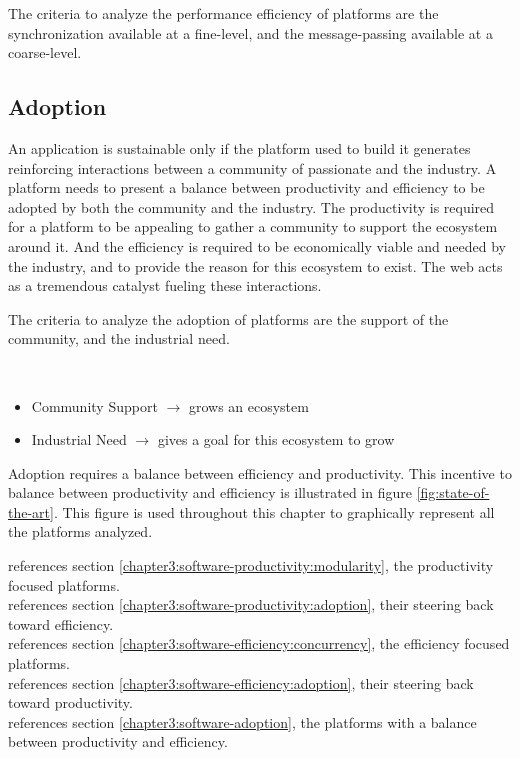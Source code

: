\separator

The criteria to analyze the performance efficiency of platforms are the synchronization available at a fine-level, and the message-passing available at a coarse-level.


\subsection{Adoption} \label{chapter3:definitions:adoption}

An application is sustainable only if the platform used to build it generates reinforcing interactions between a community of passionate and the industry.
A platform needs to present a balance between productivity and efficiency to be adopted by both the community and the industry.
The productivity is required for a platform to be appealing to gather a community to support the ecosystem around it.
And the efficiency is required to be economically viable and needed by the industry, and to provide the reason for this ecosystem to exist.
The web acts as a tremendous catalyst fueling these interactions.

\separator

The criteria to analyze the adoption of platforms are the support of the community, and the industrial need.

\atomic {
  \begin{itemize}
  \item Community Support
    \subitem $\to$ grows an ecosystem
  \item Industrial Need
    \subitem $\to$ gives a goal for this ecosystem to grow
  \end{itemize}
}

\separator

Adoption requires a balance between efficiency and productivity.
This incentive to balance between productivity and efficiency is illustrated in figure \ref{fig:state-of-the-art}.
This figure is used throughout this chapter to graphically represent all the platforms analyzed.

\noindent
{} references section \ref{chapter3:software-productivity:modularity}, the productivity focused platforms.\\
 references section \ref{chapter3:software-productivity:adoption}, their steering back toward efficiency.\\
 references section \ref{chapter3:software-efficiency:concurrency}, the efficiency focused platforms.\\
 references section \ref{chapter3:software-efficiency:adoption}, their steering back toward productivity.\\
 references section \ref{chapter3:software-adoption}, the platforms with a balance between productivity and efficiency.

